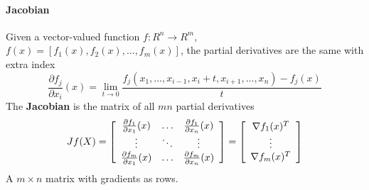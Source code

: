 \documentclass[10pt]{report}
\begin{document}
\paragraph{Jacobian} Given a vector-valued function $f:R^n\rightarrow R^m$, $f(x) = [f_1(x), f_2(x),\ldots,f_m(x)]$, the partial derivatives are the same with extra index $$\frac{\partial f_j}{\partial x_i}(x) = \lim_{t\rightarrow 0}\frac{f_j(x_1,\ldots,x_{i-1},x_i+t,x_{i+1},\ldots,x_n) - f_j(x)}{t}$$
The \textbf{Jacobian} is the matrix of all $mn$ partial derivatives
$$Jf(X) = \left[ \begin{array}{c c c}
\frac{\partial f_1}{\partial x_1}(x) & \ldots & \frac{\partial f_1}{\partial x_n}(x)\\
\vdots&\ddots&\vdots\\
\frac{\partial f_m}{\partial x_1}(x) & \ldots & \frac{\partial f_m}{\partial x_n}(x)\\
\end{array}\right] = \left[\begin{array}{c}
\nabla f_1(x)^T\\\vdots\\\nabla f_m(x)^T
\end{array}\right]$$
A $m\times n$ matrix with gradients as rows.
\end{document}
